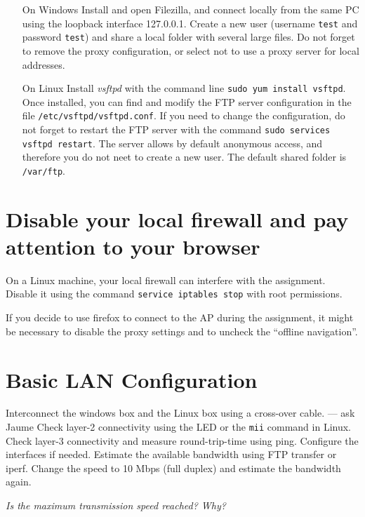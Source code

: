 \begin{itemize}

\item[On Windows] Install and open Filezilla, and connect locally from the same PC using the loopback interface 127.0.0.1. Create a new user (username \texttt{test} and password \texttt{test}) and share a local folder with several large files. Do not forget to remove the proxy configuration, or select not to use a proxy server for local addresses.

\item[On Linux] Install \emph{vsftpd} with the command line \texttt{sudo yum install vsftpd}. Once installed, you can find and modify the FTP server configuration in the file \texttt{/etc/vsftpd/vsftpd.conf}. If you need to change the configuration, do not forget to restart the FTP server with the command \texttt{sudo services vsftpd restart}. The server allows by default anonymous access, and therefore you do not neet to create a new user. The default shared folder is \texttt{/var/ftp}.

\end{itemize}

\section{Disable your local firewall and pay attention to your browser}

On a Linux machine, your local firewall can interfere with the assignment.
Disable it using the command \texttt{service iptables stop} with root permissions.

If you decide to use firefox to connect to the AP during the assignment, it might be necessary to disable the proxy settings and to uncheck the ``offline navigation''.

\section{Basic LAN Configuration}

Interconnect the windows box and the Linux box using a cross-over cable. --- ask Jaume
Check layer-2 connectivity using the LED or the \texttt{mii} command in Linux.
Check layer-3 connectivity and measure round-trip-time using ping.
Configure the interfaces if needed.
Estimate the available bandwidth using FTP transfer or iperf.
Change the speed to 10 Mbps (full duplex) and estimate the bandwidth again.

\emph{Is the maximum transmission speed reached? Why?}


